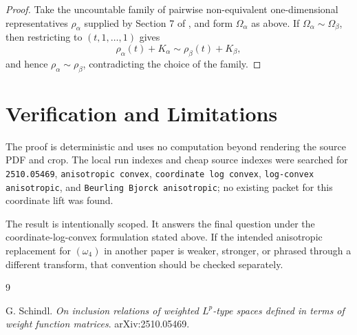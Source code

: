 \documentclass[11pt]{article}
\begin{document}
\begin{proof}
Take the uncountable family of pairwise non-equivalent one-dimensional
representatives $\rho_\alpha$ supplied by Section 7 of \cite{Schindl2510}, and
form $\Omega_\alpha$ as above.  If $\Omega_\alpha\sim\Omega_\beta$, then
restricting to $(t,1,\ldots,1)$ gives
\[
  \rho_\alpha(t)+K_\alpha \sim \rho_\beta(t)+K_\beta,
\]
and hence $\rho_\alpha\sim\rho_\beta$, contradicting the choice of the family.
\end{proof}

\section*{Verification and Limitations}

The proof is deterministic and uses no computation beyond rendering the source
PDF and crop.  The local run indexes and cheap source indexes were searched for
\texttt{2510.05469}, \texttt{anisotropic convex},
\texttt{coordinate log convex}, \texttt{log-convex anisotropic}, and
\texttt{Beurling Bjorck anisotropic}; no existing packet for this coordinate
lift was found.

The result is intentionally scoped.  It answers the final question under the
coordinate-log-convex formulation stated above.  If the intended anisotropic
replacement for $(\omega_4)$ in another paper is weaker, stronger, or phrased
through a different transform, that convention should be checked separately.

\begin{thebibliography}{9}

G. Schindl.
\newblock \emph{On inclusion relations of weighted $L^p$-type spaces defined
in terms of weight function matrices}.
\newblock arXiv:2510.05469.

\end{thebibliography}
\end{document}
